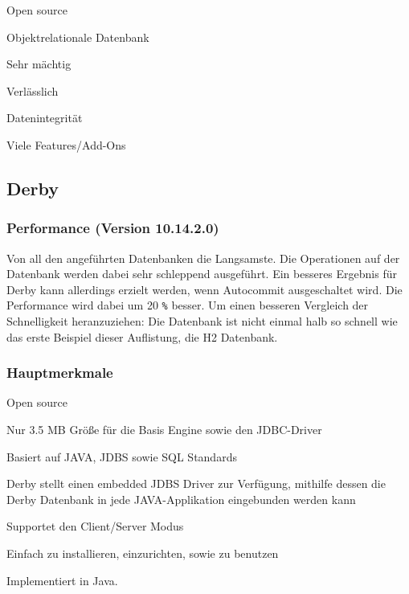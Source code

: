\begin{compactitem}
    \item Open source
    \item Objektrelationale Datenbank        
    \item Sehr mächtig
    \item Verlässlich
    \item Datenintegrität
    \item Viele Features/Add-Ons
\end{compactitem}
 
\subsection{Derby}
\subsubsection{Performance (Version 10.14.2.0)}
Von all den angeführten Datenbanken die Langsamste. Die Operationen auf der Datenbank werden dabei sehr schleppend ausgeführt. Ein besseres Ergebnis für Derby kann allerdings erzielt werden, wenn Autocommit ausgeschaltet wird. Die Performance wird dabei um 20 \texttt{\%} besser. Um einen besseren Vergleich der Schnelligkeit heranzuziehen: Die Datenbank ist nicht einmal halb so schnell wie das erste Beispiel dieser Auflistung, die H2 Datenbank.
 
\subsubsection{Hauptmerkmale}
 
\begin{compactitem}
    \item Open source
    \item Nur 3.5 MB Größe für die Basis Engine sowie den JDBC-Driver        
    \item Basiert auf JAVA, JDBS sowie SQL Standards
    \item Derby stellt einen embedded JDBS Driver zur Verfügung, mithilfe dessen die Derby Datenbank in jede JAVA-Applikation eingebunden werden kann
    \item Supportet den Client/Server Modus
    \item Einfach zu installieren, einzurichten, sowie zu benutzen
\end{compactitem}
 
Implementiert in Java.
